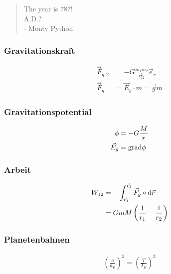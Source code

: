  \begin{quote}
  The year is 787!\\A.D.?\\- Monty Python
 \end{quote}

\begin{multicols}{2}{}
\subsubsection{Gravitationskraft}
\begin{align*}
\vec{F}_{g,2}&=-G\frac{m_1m_2}{r_{12}^2}\vec{e}_r\\
\vec{F}_g&=\vec{E}_g\cdot m=\vec{g}m
\end{align*}
\hfill

\subsubsection{Gravitationspotential}
\begin{align*}
\phi&=-G\frac{M}{r}\\
\vec{E}_g&=\mathop{}\!\mathrm{grad}\phi
\end{align*}
\hfill
\end{multicols}

\begin{multicols}{2}{}
\subsubsection{Arbeit}
\begin{align*}
W_{12}&=-\int_{\vec{r}_1}^{\vec{r}_2}\vec{F}_g\circ\mathop{}\!\mathrm{d}\vec{r}\\
&=GmM\left(\frac{1}{r_1}-\frac{1}{r_2}\right)
\end{align*}

\subsubsection{Planetenbahnen}
\begin{align*}
\left(\frac{a}{a_E}\right)^3=\left(\frac{T}{T_E}\right)^2
\end{align*}
\hfill
\end{multicols}
